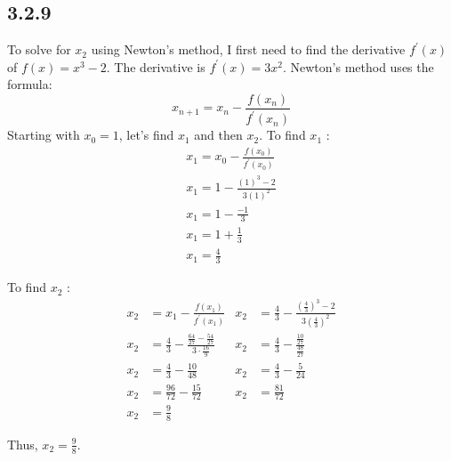 \documentclass[manuscript,screen,review]{acmart}
\begin{document}
\subsection*{3.2.9}
To solve for $x_2$ using Newton's method, I first need to find the derivative $f^{\prime}(x)$ of $f(x)=x^3-2$. The derivative is $f^{\prime}(x)=3 x^2$.
Newton's method uses the formula:
$$
x_{n+1}=x_n-\frac{f\left(x_n\right)}{f^{\prime}\left(x_n\right)}
$$
Starting with $x_0=1$, let's find $x_1$ and then $x_2$.
To find $x_1$ :
$$
\begin{gathered}
x_1=x_0-\frac{f\left(x_0\right)}{f^{\prime}\left(x_0\right)} \\
x_1=1-\frac{(1)^3-2}{3(1)^2} \\
x_1=1-\frac{-1}{3} \\
x_1=1+\frac{1}{3} \\
x_1=\frac{4}{3}
\end{gathered}
$$

To find $x_2$ :
\begin{align*}
x_2 &= x_1-\frac{f\left(x_1\right)}{f^{\prime}\left(x_1\right)} &
x_2 &= \frac{4}{3}-\frac{\left(\frac{4}{3}\right)^3-2}{3\left(\frac{4}{3}\right)^2} \\
x_2 &= \frac{4}{3}-\frac{\frac{64}{27}-\frac{54}{27}}{3 \cdot \frac{16}{9}} &
x_2 &= \frac{4}{3}-\frac{\frac{10}{27}}{\frac{48}{27}} \\
x_2 &= \frac{4}{3}-\frac{10}{48} &
x_2 &= \frac{4}{3}-\frac{5}{24} \\
x_2 &= \frac{96}{72}-\frac{15}{72} &
x_2 &= \frac{81}{72} \\
x_2 &= \frac{9}{8}
\end{align*}

Thus, $x_2=\frac{9}{8}$.
\end{document}
